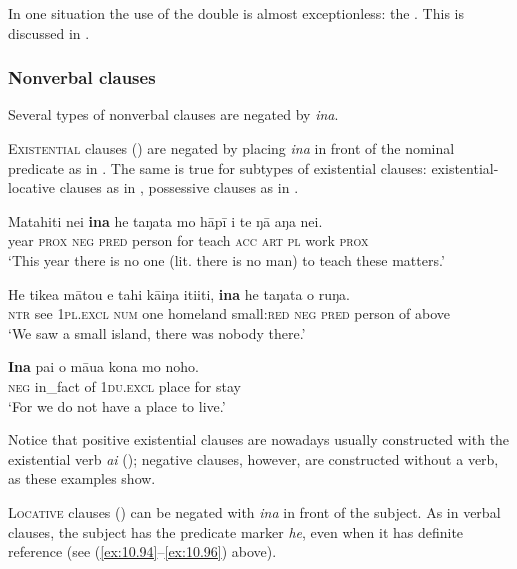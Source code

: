 In one situation the use of the double  is almost exceptionless: the . This is discussed in .

\subsubsection{Nonverbal clauses}\label{sec:10.5.1.2}

Several types of nonverbal clauses are negated by \textit{{\ꞌ}ina}.

\textsc{Existential} clauses () are negated by placing \textit{{\ꞌ}ina} in front of the nominal predicate as in . The same is true for subtypes of existential clauses: existential-locative clauses as in , possessive clauses as in . 

\ea\label{ex:10.107}
\gll Matahiti nei \textbf{{\ꞌ}ina} he taŋata mo hāpī i te ŋā aŋa nei. \\
year \textsc{prox} \textsc{neg} \textsc{pred} person for teach \textsc{acc} \textsc{art} \textsc{pl} work \textsc{prox} \\

\glt 
‘This year there is no one (lit. there is no man) to teach these matters.’ \textstyleExampleref{[R640.016]} 
\z

\ea\label{ex:10.108}
\gll He tike{\ꞌ}a mātou e tahi kāiŋa {\ꞌ}iti{\ꞌ}iti, \textbf{{\ꞌ}ina} he taŋata o ruŋa. \\
\textsc{ntr} see \textsc{1pl.excl} \textsc{num} one homeland small:\textsc{red} \textsc{neg} \textsc{pred} person of above \\

\glt 
‘We saw a small island, there was nobody there.’ \textstyleExampleref{[Egt-02.409]}
\z

\ea\label{ex:10.109}
\gll {\ꞌ}\textbf{Ina} pa{\ꞌ}i o māua kona mo noho. \\
\textsc{neg} in\_fact of \textsc{1du.excl} place for stay \\

\glt
‘For we do not have a place to live.’ \textstyleExampleref{[R229.210]} 
\z

Notice that positive existential clauses are nowadays usually constructed with the existential verb \textit{ai} (); negative clauses, however, are constructed without a verb, as these examples show.

\textsc{Locative} clauses () can be negated with \textit{{\ꞌ}ina} in front of the subject. As in verbal clauses, the subject has the predicate marker \textit{he}, even when it has definite reference (see (\ref{ex:10.94}–\ref{ex:10.96}) above). 

